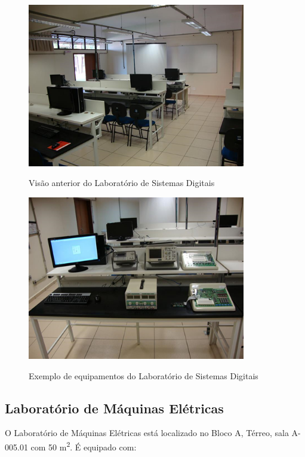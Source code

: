 \begin{figure}[!htb]
    \centering
    \caption{Visão anterior do Laboratório de Sistemas Digitais}
    \includegraphics[width=0.85\textwidth]{Caps/Figs/lab004b.png}
    \fonte{\utf}
    \label{fig:lab004b}
\end{figure}

\begin{figure}[!htb]
    \centering
    \caption{Exemplo de equipamentos do Laboratório de Sistemas Digitais}
    \includegraphics[width=0.85\textwidth]{Caps/Figs/lab004c.png}
    \fonte{\utf}
    \label{fig:lab004c}
\end{figure}

\subsection{Laboratório de Máquinas Elétricas}

O Laboratório de Máquinas Elétricas está localizado no Bloco A, Térreo, sala A-005.01 com 50 m\textsuperscript{2}. É equipado com:

